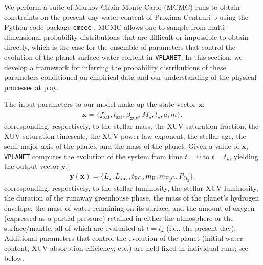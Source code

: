 \documentclass[preprint,12pt]{aastex}
\begin{document}
We perform a suite of Markov Chain Monte Carlo (MCMC) runs to obtain constraints on the
present-day water content of Proxima Centauri b using the Python code package \texttt{emcee}
\citep{ForemanMackey13}. MCMC allows one to sample from multi-dimensional probability 
distributions that are difficult or impossible to obtain directly, which is the case for
the ensemble of parameters that control the evolution of the planet surface water content
in \texttt{VPLANET}. In this section, we develop a framework for inferring the probability 
distributions of these parameters conditioned on empirical data and our understanding
of the physical processes at play.

The input parameters to our model make up the state vector $\mathbf{x}$:
%
\begin{align}
\label{eq:mcmcx}
\mathbf{x} = \{f_\mathrm{sat}, t_\mathrm{sat}, \beta_\mathrm{xuv}, M_\star, t_\star, a, m\},
\end{align}
%
corresponding, respectively, to the stellar mass, the XUV saturation fraction, the XUV saturation timescale,
the XUV power law exponent, the stellar age, the semi-major axis of the planet, and the
mass of the planet. Given a value of $\mathbf{x}$, \texttt{VPLANET} computes the evolution of the system from
time $t = 0$ to $t = t_\star$, yielding the output vector $\mathbf{y}$:
%
\begin{align}
\label{eq:mcmcy}
\mathbf{y}(\mathbf{x}) = \{L_\star, L_\mathrm{xuv}, t_\mathrm{RG}, m_\mathrm{H}, m_\mathrm{H_2O}, P_\mathrm{O_2}\},
\end{align}
%
corresponding, respectively, to the stellar luminosity, the stellar XUV luminosity, the duration of the 
runaway greenhouse phase, the mass of the
planet's hydrogen envelope, the mass of water remaining on its surface, and the amount of oxygen (expressed
as a partial pressure) retained
in either the atmosphere or the surface/mantle, all of which are evaluated at $t = t_\star$ (i.e., the present day). 
Additional parameters that control the evolution of the 
planet (initial water content, XUV absorption efficiency, etc.) are held fixed in individual runs; see below.
\end{document}
